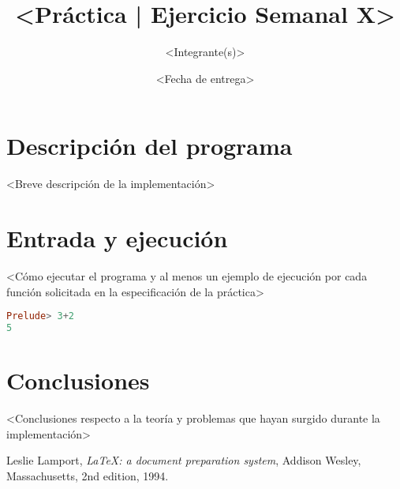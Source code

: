 \documentclass{article}
\title{\textless Práctica | Ejercicio Semanal X\textgreater}
\author{\textless Integrante(s)\textgreater}
\affil{Facultad de Ciencias, UNAM}
\date{\textless Fecha de entrega\textgreater}
\begin{document}
\maketitle

\section{Descripción del programa}

\textless Breve descripción de la implementación\textgreater

\section{Entrada y ejecución}

\textless Cómo ejecutar el programa y al menos un ejemplo de ejecución por cada función solicitada en la especificación de la práctica\textgreater

\begin{lstlisting}[language=Haskell]
Prelude> 3+2
5
\end{lstlisting}

\section{Conclusiones}

\textless Conclusiones respecto a la teoría y problemas que hayan surgido durante la implementación\textgreater


\begin{thebibliography}{9}

  Leslie Lamport,
  \emph{\LaTeX: a document preparation system},
  Addison Wesley, Massachusetts,
  2nd edition,
  1994.

\end{thebibliography}
\end{document}
